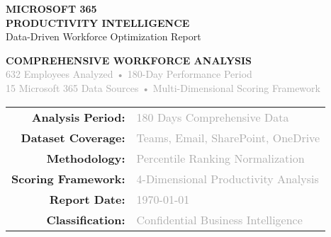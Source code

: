 \documentclass[12pt,a4paper]{article}
\begin{document}
\thispagestyle{firstpage}
\begin{titlepage}
    \vspace*{-2cm}
    \centering
    
    \begin{headerbox}
        \begin{center}
            {\Huge\color{white}\textbf{MICROSOFT 365}} \\
            \vspace{0.4cm}
            {\LARGE\color{white}\textbf{PRODUCTIVITY INTELLIGENCE}} \\
            \vspace{0.3cm}
            {\large\color{white!85}Data-Driven Workforce Optimization Report}
        \end{center}
    \end{headerbox}
    
    \vspace{0.8cm}
    
    \begin{executivebox}
        \centering
        \fontsize{14}{18}\selectfont
        \textbf{\textcolor{accentBlue}{COMPREHENSIVE WORKFORCE ANALYSIS}}\\[0.6em]
        \textcolor{darkGray}{632 Employees Analyzed • 180-Day Performance Period\\
        15 Microsoft 365 Data Sources • Multi-Dimensional Scoring Framework}
    \end{executivebox}
    
    \vspace{0.6cm}
    
    \begin{tabular}{@{}rl@{}}
        \fontsize{12}{15}\selectfont\textbf{\textcolor{primaryBlue}{Analysis Period:}} & 
        \fontsize{12}{15}\selectfont\textcolor{darkGray}{180 Days Comprehensive Data}\\[0.4em]
        \fontsize{12}{15}\selectfont\textbf{\textcolor{primaryBlue}{Dataset Coverage:}} & 
        \fontsize{12}{15}\selectfont\textcolor{darkGray}{Teams, Email, SharePoint, OneDrive}\\[0.4em]
        \fontsize{12}{15}\selectfont\textbf{\textcolor{primaryBlue}{Methodology:}} & 
        \fontsize{12}{15}\selectfont\textcolor{darkGray}{Percentile Ranking Normalization}\\[0.4em]
        \fontsize{12}{15}\selectfont\textbf{\textcolor{primaryBlue}{Scoring Framework:}} & 
        \fontsize{12}{15}\selectfont\textcolor{darkGray}{4-Dimensional Productivity Analysis}\\[0.4em]
        \fontsize{12}{15}\selectfont\textbf{\textcolor{primaryBlue}{Report Date:}} & 
        \fontsize{12}{15}\selectfont\textcolor{darkGray}{\today}\\[0.4em]
        \fontsize{12}{15}\selectfont\textbf{\textcolor{primaryBlue}{Classification:}} & 
        \fontsize{12}{15}\selectfont\textcolor{darkGray}{Confidential Business Intelligence}\\[0.4em]
    \end{tabular}
    

\end{titlepage}
\end{document}
